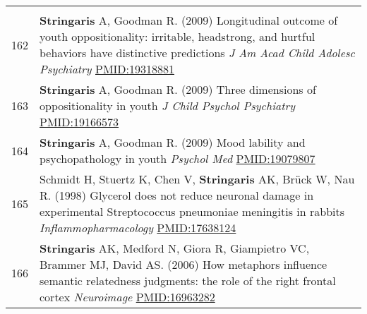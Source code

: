 \documentclass[
]{article}
\begin{document}
\begin{longtable}[]{@{}ll@{}}
\begin{minipage}[t]{0.94\columnwidth}
\end{minipage}\tabularnewline
\begin{minipage}[t]{0.01\columnwidth}\raggedright
162\strut
\end{minipage} & \begin{minipage}[t]{0.94\columnwidth}\raggedright
\textbf{Stringaris} A, Goodman R. (2009) Longitudinal outcome of youth
oppositionality: irritable, headstrong, and hurtful behaviors have
distinctive predictions \emph{J Am Acad Child Adolesc Psychiatry}
\url{PMID:19318881}\strut
\end{minipage}\tabularnewline
\begin{minipage}[t]{0.01\columnwidth}\raggedright
163\strut
\end{minipage} & \begin{minipage}[t]{0.94\columnwidth}\raggedright
\textbf{Stringaris} A, Goodman R. (2009) Three dimensions of
oppositionality in youth \emph{J Child Psychol Psychiatry}
\url{PMID:19166573}\strut
\end{minipage}\tabularnewline
\begin{minipage}[t]{0.01\columnwidth}\raggedright
164\strut
\end{minipage} & \begin{minipage}[t]{0.94\columnwidth}\raggedright
\textbf{Stringaris} A, Goodman R. (2009) Mood lability and
psychopathology in youth \emph{Psychol Med} \url{PMID:19079807}\strut
\end{minipage}\tabularnewline
\begin{minipage}[t]{0.01\columnwidth}\raggedright
165\strut
\end{minipage} & \begin{minipage}[t]{0.94\columnwidth}\raggedright
Schmidt H, Stuertz K, Chen V, \textbf{Stringaris} AK, Brück W, Nau R.
(1998) Glycerol does not reduce neuronal damage in experimental
Streptococcus pneumoniae meningitis in rabbits
\emph{Inflammopharmacology} \url{PMID:17638124}\strut
\end{minipage}\tabularnewline
\begin{minipage}[t]{0.01\columnwidth}\raggedright
166\strut
\end{minipage} & \begin{minipage}[t]{0.94\columnwidth}\raggedright
\textbf{Stringaris} AK, Medford N, Giora R, Giampietro VC, Brammer MJ,
David AS. (2006) How metaphors influence semantic relatedness judgments:
the role of the right frontal cortex \emph{Neuroimage}
\url{PMID:16963282}\strut
\end{minipage}\tabularnewline

\end{longtable}
\end{document}
